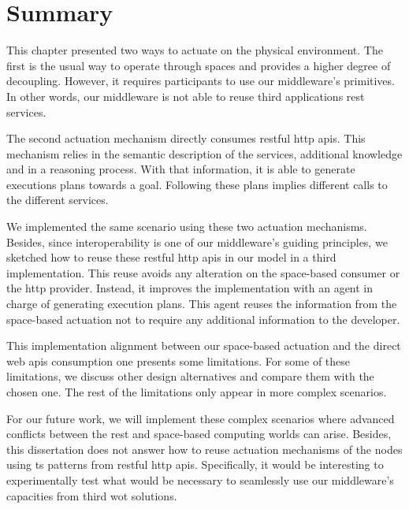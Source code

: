 \section{Summary}
\label{sec:actuation_summary}

This chapter presented two ways to actuate on the physical environment.
The first is the usual way to operate through spaces and provides a higher degree of decoupling.
However, it requires participants to use our middleware's primitives. %
In other words, our middleware is not able to reuse third applications \ac{rest} services.


The second actuation mechanism directly consumes \ac{rest}ful \acs{http} \acsp{api}.
This mechanism relies in the semantic description of the services, additional knowledge and in a reasoning process. %
With that information, it is able to generate executions plans towards a goal.
Following these plans implies different calls to the different services.


We implemented the same scenario using these two actuation mechanisms.
Besides, since interoperability is one of our middleware's guiding principles, we sketched how to reuse these \ac{rest}ful \acs{http} \acsp{api} in our \Space{} model in a third implementation.
This reuse avoids any alteration on the space-based consumer or the \ac{http} provider.
Instead, it improves the \Space{} implementation with an agent in charge of generating execution plans.
This agent reuses the information from the space-based actuation not to require any additional information to the developer.


This implementation alignment between our space-based actuation and the direct web \acsp{api} consumption one presents some limitations.
For some of these limitations, we discuss other design alternatives and compare them with the chosen one.
The rest of the limitations only appear in more complex scenarios.


For our future work, we will implement these complex scenarios where advanced conflicts between the \ac{rest} and space-based computing worlds can arise.
Besides, this dissertation does not answer how to reuse actuation mechanisms of the nodes using \ac{ts} patterns from \ac{rest}ful \acs{http} \acsp{api}.
Specifically, it would be interesting to experimentally test what would be necessary to seamlessly use our middleware's capacities from  third \ac{wot} solutions.